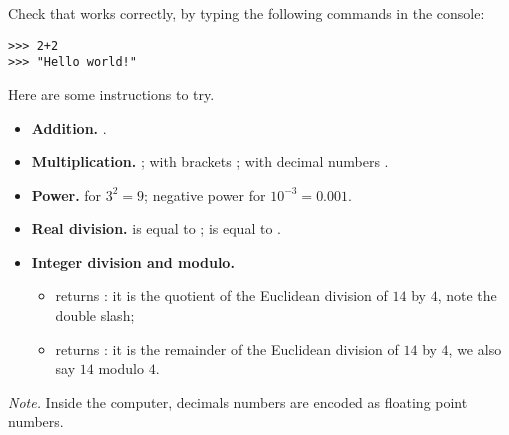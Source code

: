 \documentclass[11pt,class=report,crop=false]{standalone}
\begin{document}







\begin{cours}

Check that \Python{} works correctly, by typing the following commands in the  \Python{} console:
\begin{lstlisting}
>>> 2+2
>>> "Hello world!"
\end{lstlisting}

Here are some instructions to try.
\begin{itemize}
  \item \textbf{Addition.} .
  \item \textbf{Multiplication.} 
  ; with brackets ; with decimal numbers .
  \item \textbf{Power.}  for $3^2=9$; negative power  for $10^{-3} = 0.001$.
  \item \textbf{Real division.}  is equal to ;  is equal to .
  \item \textbf{Integer division and modulo.}
  \begin{itemize}
    \item {} returns : it is the quotient of the Euclidean division of $14$ by $4$, note the double slash;
    \item {} returns : it is the remainder of the Euclidean division of $14$ by $4$, we also say \og{}$14$ modulo $4$\fg.
  \end{itemize}
\end{itemize}

\emph{Note.} Inside the computer, decimals numbers are encoded as \og{}floating point numbers\fg{}.
\end{cours}


\end{document}
